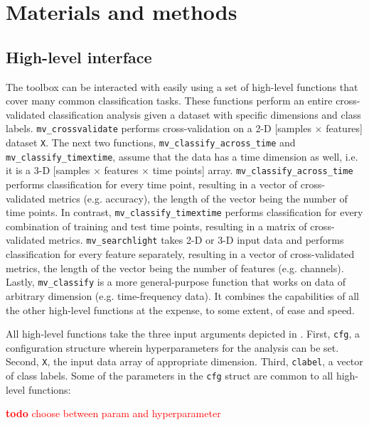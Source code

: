 \documentclass[utf8]{frontiersSCNS} %
\newcommand{\ttt}[1]{\texttt{#1}}
\newcommand{\todo}[1]{\textcolor{red}{\textbf{todo} #1}}
\begin{document}
\section{Materials and methods}

\subsection{High-level interface}


The toolbox can be interacted with easily using a set of high-level functions that cover many common classification tasks. These functions perform an entire cross-validated classification analysis given a dataset with specific dimensions and class labels. \ttt{mv\_crossvalidate} performs  cross-validation on a 2-D [samples $\times$ features] dataset \ttt{X}. The next two functions, \ttt{mv\_classify\_across\_time}  and \ttt{mv\_classify\_timextime}, assume that the data has a time dimension as well, i.e. it is a 3-D [samples $\times$ features $\times$ time points] array. \ttt{mv\_classify\_across\_time} performs classification for every time point, resulting in a vector of cross-validated metrics (e.g. accuracy), the length of the vector being the number of time points. In contrast, \ttt{mv\_classify\_timextime} performs  classification for every combination of training and test time points, resulting in a matrix of cross-validated metrics. \ttt{mv\_searchlight} takes 2-D or 3-D input data and performs classification for every feature separately, resulting in a vector of cross-validated metrics, the length of the vector being the number of features (e.g. channels). Lastly, \ttt{mv\_classify} is a more general-purpose function that works on data of arbitrary dimension (e.g. time-frequency data). It combines the capabilities of all the other high-level functions at the expense, to some extent, of ease and speed.

All high-level functions take the three input arguments depicted in . First, \ttt{cfg}, a configuration structure wherein hyperparameters for the analysis can be set. Second, \ttt{X}, the input data array of appropriate dimension. Third, \ttt{clabel}, a vector of class labels.
Some of the parameters in the \ttt{cfg} struct are common  to all high-level functions:

\todo{choose between param and hyperparameter}
\end{document}
